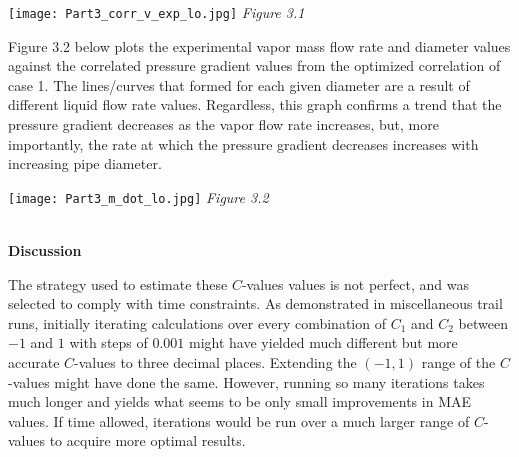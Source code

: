 \begin{center}
\texttt{[image: Part3\_corr\_v\_exp\_lo.jpg]}
\textit{Figure 3.1}
\end{center}

Figure 3.2 below plots the experimental vapor mass flow rate and diameter values against the correlated pressure gradient values from the optimized correlation of case 1. The lines/curves that formed for each given diameter are a result of different liquid flow rate values. Regardless, this graph confirms a trend that the pressure gradient decreases as the vapor flow rate increases, but, more importantly, the rate at which the pressure gradient decreases increases with increasing pipe diameter.

\begin{center}
\texttt{[image: Part3\_m\_dot\_lo.jpg]}
\textit{Figure 3.2}
\end{center}

\\
\textbf{Discussion}

The strategy used to estimate these \(C\)-values values is not perfect, and was selected to comply with time constraints. As demonstrated in miscellaneous trail runs, initially iterating calculations over every combination of \(C_1\) and \(C_2\) between \(-1\) and \(1\) with steps of \(0.001\) might have yielded much different but more accurate \(C\)-values to three decimal places. Extending the \((-1,1)\) range of the \(C\)-values might have done the same. However, running so many iterations takes much longer and yields what seems to be only small improvements in MAE values. If time allowed, iterations would be run over a much larger range of \(C\)-values to acquire more optimal results. 



